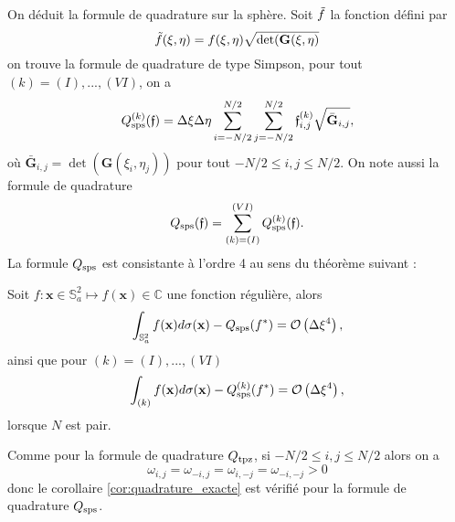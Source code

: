 On déduit la formule de quadrature sur la sphère. Soit $\tilde{f}$ la fonction défini par
\begin{equation}
\tilde{f}(\xi, \eta) = f(\xi, \eta) \sqrt{\det(\mathbf{G}(\xi, \eta)}
\end{equation}
on trouve la formule de quadrature de type Simpson,
pour tout $(k) = (I), ..., (VI)$, on a
\begin{equation}
Q_{\text{sps}}^{(k)}(\mathfrak{f}) = \Delta \xi \Delta \eta \displaystyle\sum\limits_{i=-N/2}^{N/2} \displaystyle\sum\limits_{j=-N/2}^{N/2}\mathfrak{f}_{i,j}^{(k)} \sqrt{\bar{\mathbf{G}}_{i,j}},
\end{equation}
où $\bar{\mathbf{G}}_{i,j}=\det(\mathbf{G}(\xi_i,\eta_j))$ pour tout $-N/2 \leq i,j \leq N/2$. On note aussi la formule de quadrature
\begin{equation}
Q_{\text{sps}}(\mathfrak{f}) = \displaystyle\sum\limits_{(k)=(I)}^{(VI)}Q_{\text{sps}}^{(k)}(\mathfrak{f}).
\end{equation}
La formule $Q_{\text{sps}}$ est consistante à l'ordre 4 au sens du théorème suivant :


\begin{theoreme}
Soit $f : \mathbf{x} \in \mathbb{S}_a^2 \mapsto f(\mathbf{x}) \in \mathbb{C}$ une fonction régulière, alors
\begin{equation}
\displaystyle\int_{\mathbb{S}_a^2} f(\mathbf{x}) d\sigma(\mathbf{x}) - Q_{\text{sps}}(f^*) = \mathcal{O} \left( \Delta \xi^4 \right),
\end{equation}
ainsi que pour $(k) = (I), ..., (VI)$
\begin{equation}
\displaystyle\int_{(k)} f(\mathbf{x}) d\sigma(\mathbf{x}) - Q_{\text{sps}}^{(k)}(f^*) = \mathcal{O} \left( \Delta \xi^4 \right),
\end{equation}
lorsque $N$ est pair.
\end{theoreme}

\begin{remarque}
Comme pour la formule de quadrature $Q_{\text{tpz}}$, si $-N/2 \leq i,j \leq N/2$ alors on a 
\begin{equation}
\omega_{i,j} = \omega_{-i,j} = \omega_{i,-j} = \omega_{-i,-j} > 0
\end{equation}
donc le corollaire \ref{cor:quadrature_exacte} est vérifié pour la formule de quadrature $Q_{\text{sps}}$.
\end{remarque}





















